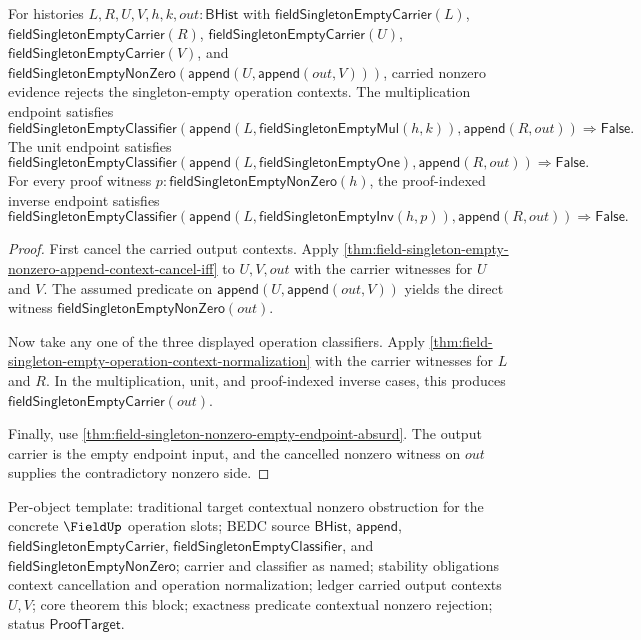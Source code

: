 \begin{theorem}
\label{thm:field-singleton-empty-operation-context-carried-nonzero-obstruction}
For histories $L,R,U,V,h,k,out:\mathsf{BHist}$ with
$\mathsf{fieldSingletonEmptyCarrier}(L)$,
$\mathsf{fieldSingletonEmptyCarrier}(R)$,
$\mathsf{fieldSingletonEmptyCarrier}(U)$,
$\mathsf{fieldSingletonEmptyCarrier}(V)$, and
$\mathsf{fieldSingletonEmptyNonZero}
  (\mathsf{append}(U,\mathsf{append}(out,V)))$, carried nonzero evidence
rejects the singleton-empty operation contexts. The multiplication endpoint
satisfies
$$
\mathsf{fieldSingletonEmptyClassifier}
  (\mathsf{append}(L,\mathsf{fieldSingletonEmptyMul}(h,k)),
   \mathsf{append}(R,out))
\Longrightarrow
\mathsf{False}.
$$
The unit endpoint satisfies
$$
\mathsf{fieldSingletonEmptyClassifier}
  (\mathsf{append}(L,\mathsf{fieldSingletonEmptyOne}),
   \mathsf{append}(R,out))
\Longrightarrow
\mathsf{False}.
$$
For every proof witness $p:\mathsf{fieldSingletonEmptyNonZero}(h)$, the
proof-indexed inverse endpoint satisfies
$$
\mathsf{fieldSingletonEmptyClassifier}
  (\mathsf{append}(L,\mathsf{fieldSingletonEmptyInv}(h,p)),
   \mathsf{append}(R,out))
\Longrightarrow
\mathsf{False}.
$$
\end{theorem}
\begin{proof}
First cancel the carried output contexts. Apply
\autoref{thm:field-singleton-empty-nonzero-append-context-cancel-iff} to
$U,V,out$ with the carrier witnesses for $U$ and $V$. The assumed predicate on
$\mathsf{append}(U,\mathsf{append}(out,V))$ yields the direct witness
$\mathsf{fieldSingletonEmptyNonZero}(out)$.

Now take any one of the three displayed operation classifiers. Apply
\autoref{thm:field-singleton-empty-operation-context-normalization} with the
carrier witnesses for $L$ and $R$. In the multiplication, unit, and
proof-indexed inverse cases, this produces
$\mathsf{fieldSingletonEmptyCarrier}(out)$.

Finally, use \autoref{thm:field-singleton-nonzero-empty-endpoint-absurd}. The
output carrier is the empty endpoint input, and the cancelled nonzero witness on
$out$ supplies the contradictory nonzero side.
\end{proof}

Per-object template: traditional target contextual nonzero obstruction for the
concrete $\FieldUp$ operation slots; BEDC source $\mathsf{BHist}$,
$\mathsf{append}$, $\mathsf{fieldSingletonEmptyCarrier}$,
$\mathsf{fieldSingletonEmptyClassifier}$, and
$\mathsf{fieldSingletonEmptyNonZero}$; carrier and classifier as named;
stability obligations context cancellation and operation normalization; ledger
carried output contexts $U,V$; core theorem this block; exactness predicate
contextual nonzero rejection; status $\mathsf{ProofTarget}$.

